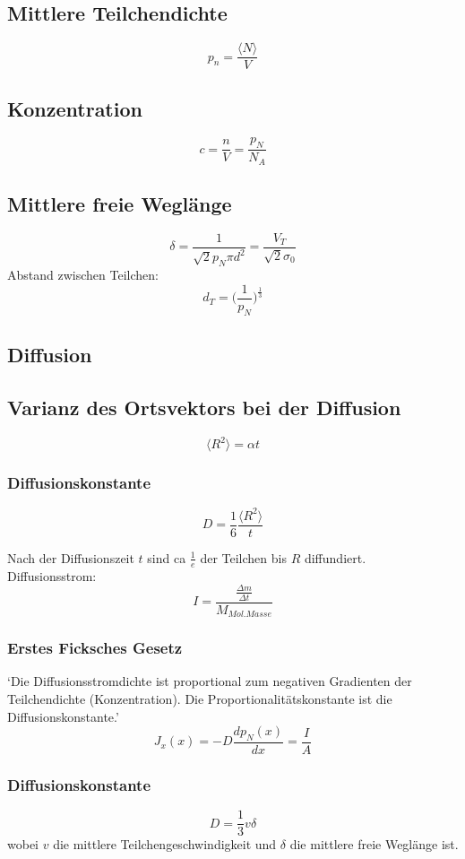 \documentclass{article}
\begin{document}
\begin{multicols*}{3}
  \subsection{Mittlere Teilchendichte}
  $$p_n = \frac{\langle N \rangle }{V}$$

  \subsection{Konzentration}
  $$c= \frac{n}{V} = \frac{p_N}{N_A}$$

  \subsection{Mittlere freie Weglänge}
  $$\delta = \frac{1}{\sqrt{2}p_N\pi d^2} = \frac{V_T}{\sqrt{2}\sigma _0}$$
  Abstand zwischen Teilchen:
  $$d_T=\bigg(\frac{1}{p_N}\bigg) ^{\frac{1}{3}}$$

  \subsection{Diffusion}

  \subsection{Varianz des Ortsvektors bei der Diffusion}
  $$\langle R^2\rangle = \alpha t$$

  \subsubsection{Diffusionskonstante}

  $$D = \frac{1}{6}\frac{\langle R^2\rangle}{t}$$

  Nach der Diffusionszeit $t$ sind ca $\frac{1}{e}$ der Teilchen bis $R$ diffundiert.\\

  Diffusionsstrom:
  $$I = \frac{\frac{\Delta m}{\Delta t}}{M_{Mol. Masse}}$$

  \subsubsection{Erstes Ficksches Gesetz}
  ‘Die Diffusionsstromdichte ist proportional zum negativen Gradienten der Teilchendichte
  (Konzentration). Die Proportionalitätskonstante ist die Diffusionskonstante.’
  $$J_x(x)=-D\frac{dp_N(x)}{dx}=\frac{I}{A}$$

  \subsubsection{Diffusionskonstante}
  $$D = \frac{1}{3}v\delta$$
  wobei $v$ die mittlere Teilchengeschwindigkeit und $\delta$ die mittlere freie Weglänge ist.


\end{multicols*}
\end{document}
